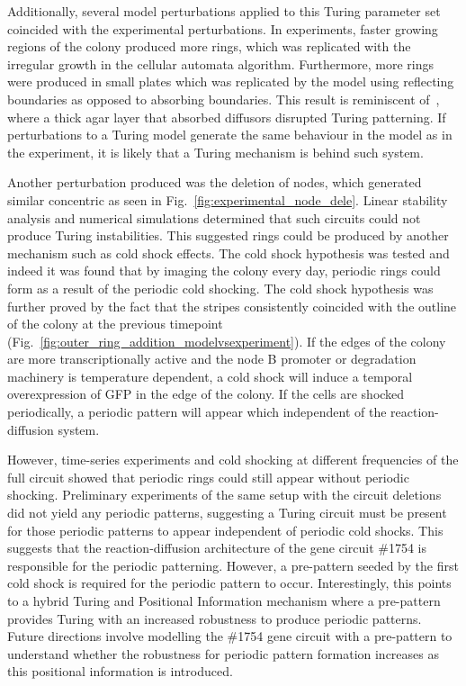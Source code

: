 Additionally, several model perturbations applied to this Turing parameter set coincided with the experimental perturbations.
In experiments, faster growing regions of the colony produced more rings, which was replicated with the irregular growth in the cellular automata algorithm.
Furthermore, more rings were produced in small plates which was replicated by the model using reflecting boundaries as opposed to absorbing boundaries.
This result is reminiscent of~\cite{Krause2020}, where a thick agar layer that absorbed diffusors disrupted Turing patterning.
If perturbations to a Turing model generate the same behaviour in the model as in the experiment, it is likely that a Turing mechanism is behind such system.

Another perturbation produced was the deletion of nodes, which generated similar concentric as seen in Fig.~\ref{fig:experimental_node_dele}.
Linear stability analysis and numerical simulations determined that such circuits could not produce Turing instabilities.
This suggested rings could be produced by another mechanism such as cold shock effects.
The cold shock hypothesis was tested and indeed it was found that by imaging the colony every day, periodic rings could form as a result of the periodic cold shocking.
The cold shock hypothesis was further proved by the fact that the stripes consistently coincided with the outline of the colony at the previous timepoint (Fig.~\ref{fig:outer_ring_addition_modelvsexperiment}).
If the edges of the colony are more transcriptionally active and the node B promoter or degradation machinery is temperature dependent, a cold shock will induce a temporal overexpression of GFP in the edge of the colony.
If the cells are shocked periodically, a periodic pattern will appear which independent of the reaction-diffusion system.

However, time-series experiments and cold shocking at different frequencies of the full circuit showed that periodic rings could still appear without periodic shocking.
Preliminary experiments of the same setup with the circuit deletions did not yield any periodic patterns, suggesting a Turing circuit must be present for those periodic patterns to appear independent of periodic cold shocks.
This suggests that the reaction-diffusion architecture of the gene circuit \#1754 is responsible for the periodic patterning.
However, a pre-pattern seeded by the first cold shock is required for the periodic pattern to occur.
Interestingly, this points to a hybrid Turing and Positional Information mechanism where a pre-pattern provides Turing with an increased robustness to produce periodic patterns.
Future directions involve modelling the \#1754 gene circuit with a pre-pattern to understand whether the robustness for periodic pattern formation increases as this positional information is introduced.


